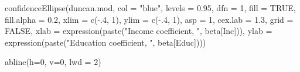 \documentclass[
  letterpaper,
  10pt,
  krantz2]{krantz}
\makeatletter
\newenvironment{Shaded}{\begin{snugshade}}{\end{snugshade}}
\newcommand{\AttributeTok}[1]{\textcolor[rgb]{0.40,0.45,0.13}{#1}}
\newcommand{\ConstantTok}[1]{\textcolor[rgb]{0.56,0.35,0.01}{#1}}
\newcommand{\DecValTok}[1]{\textcolor[rgb]{0.68,0.00,0.00}{#1}}
\newcommand{\FloatTok}[1]{\textcolor[rgb]{0.68,0.00,0.00}{#1}}
\newcommand{\FunctionTok}[1]{\textcolor[rgb]{0.28,0.35,0.67}{#1}}
\newcommand{\NormalTok}[1]{\textcolor[rgb]{0.00,0.23,0.31}{#1}}
\newcommand{\SpecialCharTok}[1]{\textcolor[rgb]{0.37,0.37,0.37}{#1}}
\newcommand{\StringTok}[1]{\textcolor[rgb]{0.13,0.47,0.30}{#1}}
\newenvironment{kframe}{%
  \medskip{}
  \setlength{\fboxsep}{.8em}
  \def\at@end@of@kframe{}%
  \ifinner\ifhmode%
  \def\at@end@of@kframe{\end{minipage}}%
  \begin{minipage}{\columnwidth}%
  \fi\fi%
  \def\FrameCommand##1{\hskip\@totalleftmargin \hskip-\fboxsep
  \colorbox{shadecolor}{##1}\hskip-\fboxsep
      \hskip-\linewidth \hskip-\@totalleftmargin \hskip\columnwidth}%
  \MakeFramed {\advance\hsize-\width
    \@totalleftmargin\z@ \linewidth\hsize
    \@setminipage}}%
{\par\unskip\endMakeFramed%
  \at@end@of@kframe}
\renewenvironment{Shaded}{\begin{kframe}}{\end{kframe}}
\makeatother
\begin{document}
\begin{Shaded}
\begin{Highlighting}[]
\FunctionTok{confidenceEllipse}\NormalTok{(duncan.mod, }\AttributeTok{col =} \StringTok{"blue"}\NormalTok{,}
  \AttributeTok{levels =} \FloatTok{0.95}\NormalTok{, }\AttributeTok{dfn =} \DecValTok{1}\NormalTok{,}
  \AttributeTok{fill =} \ConstantTok{TRUE}\NormalTok{, }\AttributeTok{fill.alpha =} \FloatTok{0.2}\NormalTok{,}
  \AttributeTok{xlim =} \FunctionTok{c}\NormalTok{(}\SpecialCharTok{{-}}\NormalTok{.}\DecValTok{4}\NormalTok{, }\DecValTok{1}\NormalTok{),}
  \AttributeTok{ylim =} \FunctionTok{c}\NormalTok{(}\SpecialCharTok{{-}}\NormalTok{.}\DecValTok{4}\NormalTok{, }\DecValTok{1}\NormalTok{), }\AttributeTok{asp =} \DecValTok{1}\NormalTok{,}
  \AttributeTok{cex.lab =} \FloatTok{1.3}\NormalTok{,}
  \AttributeTok{grid =} \ConstantTok{FALSE}\NormalTok{,}
  \AttributeTok{xlab =} \FunctionTok{expression}\NormalTok{(}\FunctionTok{paste}\NormalTok{(}\StringTok{"Income coefficient, "}\NormalTok{, beta[Inc])),}
  \AttributeTok{ylab =} \FunctionTok{expression}\NormalTok{(}\FunctionTok{paste}\NormalTok{(}\StringTok{"Education coefficient, "}\NormalTok{, beta[Educ])))}

\FunctionTok{abline}\NormalTok{(}\AttributeTok{h=}\DecValTok{0}\NormalTok{, }\AttributeTok{v=}\DecValTok{0}\NormalTok{, }\AttributeTok{lwd =} \DecValTok{2}\NormalTok{)}


\end{Highlighting}
\end{Shaded}
\end{document}
